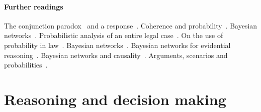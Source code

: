 \documentclass[10pt]{article}
\begin{document}
\paragraph{Further readings}
The conjunction paradox~\citep{cohen1977} and a response~\citep{dawid1987}. 
Coherence and probability~\citep{bovensHartman2003}.
Bayesian networks~\citep{taroniEtal2006}. Probabilistic 
analysis of an entire legal case~\citep{kadaneSchum1996,vlekEtal2014}.
On the use of probability in law~\citep{fenton2011}.
Bayesian networks~\citep{pearl1988,darwiche2009,jensenNielsen2007,fentonNeil2013}.
Bayesian networks for evidential reasoning~\citep{taroniEtal2006,heplerEtal2007,fentonNeilLagnado2013}. 
Bayesian networks and causality~\citep{pearl2000,dawid2010}.
Arguments, scenarios and probabilities~\citep{keppensSchafer2006,keppens2012,vlekEtal2016,timmerEtAl2017, verheijEtal2016,verheij2014,verheij2017}. 


\section{Reasoning and decision making}
\label{sec:whenconv}
\label{sec:intexc}

\end{document}
